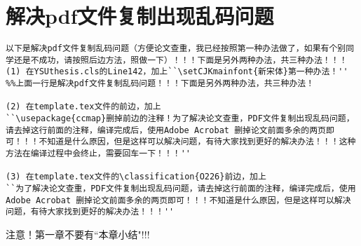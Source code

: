 \section{解决pdf文件复制出现乱码问题}\label{section1-4}
\begin{verbatim}
以下是解决pdf文件复制乱码问题（方便论文查重，我已经按照第一种办法做了，如果有个别同学还是不成功，请按照后边方法，照做一下）！！！下面是另外两种办法，共三种办法！！！
(1) 在YSUthesis.cls的Line142，加上``\setCJKmainfont{新宋体}第一种办法！''
%%上面一行是解决pdf文件复制乱码问题！！！下面是另外两种办法，共三种办法！

(2) 在template.tex文件的前边，加上
``\usepackage{ccmap}删掉前边的注释！为了解决论文查重，PDF文件复制出现乱码问题，请去掉这行前面的注释，编译完成后，使用Adobe Acrobat 删掉论文前面多余的两页即可！！！不知道是什么原因，但是这样可以解决问题，有待大家找到更好的解决办法！！！这种方法在编译过程中会终止，需要回车一下！！！''

(3) 在template.tex文件的\classification{O226}前边，加上
``为了解决论文查重，PDF文件复制出现乱码问题，请去掉这行前面的注释，编译完成后，使用Adobe Acrobat 删掉论文前面多余的两页即可！！！不知道是什么原因，但是这样可以解决问题，有待大家找到更好的解决办法！！！''
\end{verbatim}

注意！第一章不要有``本章小结"!!!